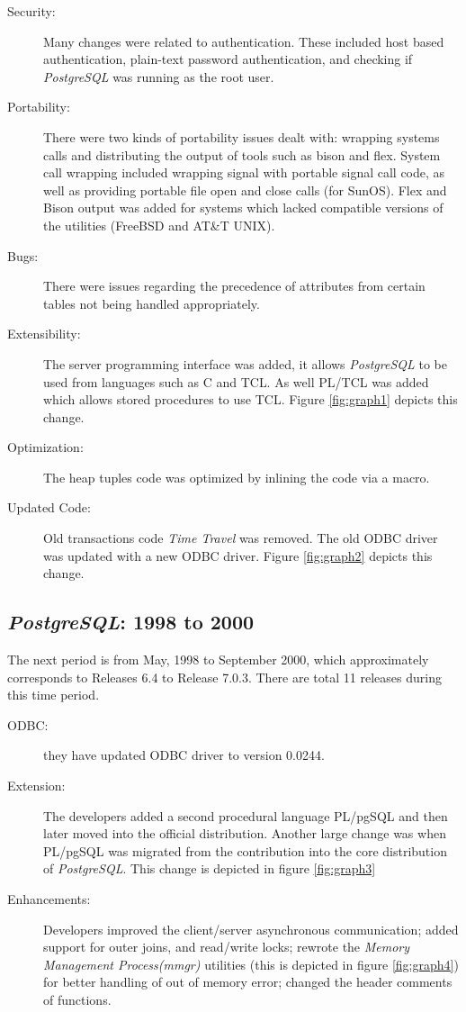 \documentclass[times, 10pt,twocolumn]{article}
\newcommand{\postgresql}{\emph{PostgreSQL}\xspace}
\newcommand{\Subsection}[1]{\subsection{#1}}
\begin{document}
\begin{description}
\item[Security:] Many changes were related to authentication. These
    included host based authentication, plain-text password authentication,
    and checking if \postgresql was running as the root user.
\item[Portability:] There were two kinds of portability issues dealt with:
    wrapping systems calls and distributing the output of tools such as
    bison and flex.  System call wrapping included wrapping signal with
    portable signal call code, as well as providing portable file open and
    close calls (for SunOS).  Flex and Bison output was added for systems
    which lacked compatible versions of the utilities (FreeBSD and AT\&T
    UNIX).
\item[Bugs:] There were issues regarding the precedence of attributes from
    certain tables not being handled appropriately.
\item[Extensibility:] The server programming interface was added, it allows
    \postgresql to be used from languages such as C and TCL. As well PL/TCL
    was added which allows stored procedures to use TCL. Figure
    \ref{fig:graph1} depicts this change.
\item[Optimization:] The heap tuples code was optimized by inlining the
    code via a macro.
\item[Updated Code:] Old transactions code \emph{Time Travel} was removed.
    The old ODBC driver was updated with a new ODBC driver.  Figure
    \ref{fig:graph2} depicts this change. 
\end{description}



\Subsection{\postgresql: 1998 to 2000}

The next period is from May, 1998 to September 2000, which approximately
corresponds to Releases 6.4 to Release 7.0.3.  There are total 11 releases
during this time period.  

\begin{description}
\item[ODBC:] they have updated ODBC driver to version 0.0244.
\item[Extension:] The developers added a second procedural language
    PL/pgSQL and then later moved into the official distribution. Another
    large change was when PL/pgSQL was migrated from the contribution into
    the core distribution of \postgresql. This change is depicted in figure
    \ref{fig:graph3}
\item[Enhancements: ] Developers improved the client/server asynchronous
    communication; added support for outer joins, and read/write locks;
    rewrote the \emph{Memory Management Process(mmgr)} utilities (this is
    depicted in figure \ref{fig:graph4}) for better handling of out of
    memory error; changed the header comments of functions.
    
\end{description}
\end{document}
